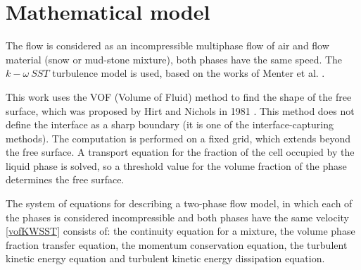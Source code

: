 \documentclass[sensors,article,submit,moreauthors,pdftex]{Definitions/mdpi}
\begin{document}
\section{Mathematical model}

The flow is considered as an incompressible multiphase flow of air and flow material (snow or mud-stone mixture), both phases have the same speed. The $k-\omega\ SST$ turbulence model is used, based on the works of Menter et al. \cite{Menter1993, Menter1994, MenterKuntzLangtry2003}.

This work uses the VOF (Volume of Fluid) method to find the shape of the free surface, which was proposed by Hirt and Nichols in 1981 \cite{HirtNichols1981}. This method does not define the interface as a sharp boundary (it is one of the interface-capturing methods). The computation is performed on a fixed grid, which extends beyond the free surface. A transport equation for the fraction of the cell occupied by the liquid phase is solved, so a threshold value for the volume fraction of the phase determines the free surface.

The system of equations for describing a two-phase flow model, in which each of the phases is considered incompressible and both phases have the same velocity \eqref{vofKWSST} consists of: the continuity equation for a mixture, the volume phase fraction transfer equation, the momentum conservation equation, the turbulent kinetic energy equation and turbulent kinetic energy dissipation equation.
\end{document}
